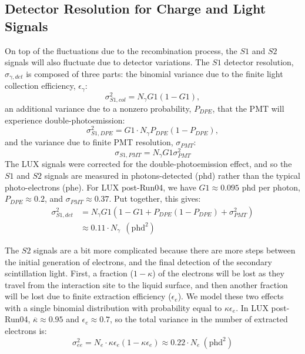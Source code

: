 \clearpage

\subsection{Detector Resolution for Charge and Light Signals}\label{sec:detres}
On top of the fluctuations due to the recombination process, the $S1$ and $S2$ signals will also fluctuate due to detector variations. The $S1$ detector resolution, $\sigma_{\gamma,det}$ is composed of three parts: the binomial variance due to the finite light collection efficiency, $\epsilon_{\gamma}$:
\begin{equation}
\sigma_{S1,col}^2=N_{\gamma}G1(1-G1), 
\end{equation}
an additional variance due to a nonzero probability, $P_{DPE}$, that the PMT will experience double-photoemission\cite{DPE}:
\begin{equation}
\sigma_{S1,DPE}^2=G1\cdot N_{\gamma}P_{DPE}(1-P_{DPE}), 
\end{equation}
and the variance due to finite PMT resolution, $\sigma_{PMT}$:
\begin{equation}
\sigma_{S1,PMT}=N_{\gamma}G1\sigma_{PMT}^2
\end{equation}
The LUX signals were corrected for the double-photoemission effect, and so the $S1$ and $S2$ signals are measured in photons-detected (phd) rather than the typical photo-electrons (phe). For LUX post-Run04, we have $G1\approx 0.095$ phd per photon, $P_{DPE}\approx 0.2$, and $\sigma_{PMT}\approx 0.37$. Put together, this gives:
\begin{equation}
\begin{split}
\sigma_{S1,det}^2&=N_{\gamma}G1(1-G1+P_{DPE}(1-P_{DPE})+\sigma_{PMT}^2)\\
&\approx 0.11 \cdot N_{\gamma} \ \ (\text{phd}^2)
\end{split}
\end{equation}

The $S2$ signals are a bit more complicated because there are more steps between the initial generation of electrons, and the final detection of the secondary scintillation light. First, a fraction ($1-\kappa$) of the electrons will be lost as they travel from the interaction site to the liquid surface, and then another fraction will be lost due to finite extraction efficiency ($\epsilon_e$). We model these two effects with a single binomial distribution with probability equal to $\kappa\epsilon_e$. In LUX post-Run04, $\overline{\kappa} \approx 0.95$ and $\epsilon_e \approx 0.7$, so the total variance in the number of extracted electrons is:
\begin{equation}
\sigma_{ee}^2=N_e\cdot \kappa\epsilon_e(1-\kappa\epsilon_e)\approx 0.22 \cdot N_e \ (\text{phd}^2)
\end{equation}

